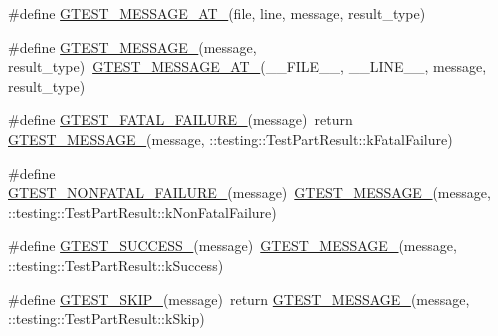 \begin{DoxyCompactItemize}
\item 
\#define \mbox{\hyperlink{googletest-master_2googletest_2include_2gtest_2internal_2gtest-internal_8h_a8d70025c45a47a493780746dfd66d565}{G\+T\+E\+S\+T\+\_\+\+M\+E\+S\+S\+A\+G\+E\+\_\+\+A\+T\+\_\+}}(file,  line,  message,  result\+\_\+type)
\item 
\#define \mbox{\hyperlink{googletest-master_2googletest_2include_2gtest_2internal_2gtest-internal_8h_a94c73d5368ec946bc354d0992ad00810}{G\+T\+E\+S\+T\+\_\+\+M\+E\+S\+S\+A\+G\+E\+\_\+}}(message,  result\+\_\+type)~\mbox{\hyperlink{_obj__test_2lib_2googletest-release-1_88_81_2googletest_2include_2gtest_2internal_2gtest-internal_8h_a8d70025c45a47a493780746dfd66d565}{G\+T\+E\+S\+T\+\_\+\+M\+E\+S\+S\+A\+G\+E\+\_\+\+A\+T\+\_\+}}(\+\_\+\+\_\+\+F\+I\+L\+E\+\_\+\+\_\+, \+\_\+\+\_\+\+L\+I\+N\+E\+\_\+\+\_\+, message, result\+\_\+type)
\item 
\#define \mbox{\hyperlink{googletest-master_2googletest_2include_2gtest_2internal_2gtest-internal_8h_a0f9a4c3ea82cc7bf4478eaffdc168358}{G\+T\+E\+S\+T\+\_\+\+F\+A\+T\+A\+L\+\_\+\+F\+A\+I\+L\+U\+R\+E\+\_\+}}(message)~return \mbox{\hyperlink{_obj__test_2lib_2googletest-release-1_88_81_2googletest_2include_2gtest_2internal_2gtest-internal_8h_a94c73d5368ec946bc354d0992ad00810}{G\+T\+E\+S\+T\+\_\+\+M\+E\+S\+S\+A\+G\+E\+\_\+}}(message, \+::testing\+::\+Test\+Part\+Result\+::k\+Fatal\+Failure)
\item 
\#define \mbox{\hyperlink{googletest-master_2googletest_2include_2gtest_2internal_2gtest-internal_8h_a6cb7482cfa03661a91c698eb5895f642}{G\+T\+E\+S\+T\+\_\+\+N\+O\+N\+F\+A\+T\+A\+L\+\_\+\+F\+A\+I\+L\+U\+R\+E\+\_\+}}(message)~\mbox{\hyperlink{_obj__test_2lib_2googletest-release-1_88_81_2googletest_2include_2gtest_2internal_2gtest-internal_8h_a94c73d5368ec946bc354d0992ad00810}{G\+T\+E\+S\+T\+\_\+\+M\+E\+S\+S\+A\+G\+E\+\_\+}}(message, \+::testing\+::\+Test\+Part\+Result\+::k\+Non\+Fatal\+Failure)
\item 
\#define \mbox{\hyperlink{googletest-master_2googletest_2include_2gtest_2internal_2gtest-internal_8h_abe012b550eb3807e8c49f7e161bd1567}{G\+T\+E\+S\+T\+\_\+\+S\+U\+C\+C\+E\+S\+S\+\_\+}}(message)~\mbox{\hyperlink{_obj__test_2lib_2googletest-release-1_88_81_2googletest_2include_2gtest_2internal_2gtest-internal_8h_a94c73d5368ec946bc354d0992ad00810}{G\+T\+E\+S\+T\+\_\+\+M\+E\+S\+S\+A\+G\+E\+\_\+}}(message, \+::testing\+::\+Test\+Part\+Result\+::k\+Success)
\item 
\#define \mbox{\hyperlink{googletest-master_2googletest_2include_2gtest_2internal_2gtest-internal_8h_ab75ed7a6cd9e466944ce680c1c07ab47}{G\+T\+E\+S\+T\+\_\+\+S\+K\+I\+P\+\_\+}}(message)~return \mbox{\hyperlink{_obj__test_2lib_2googletest-release-1_88_81_2googletest_2include_2gtest_2internal_2gtest-internal_8h_a94c73d5368ec946bc354d0992ad00810}{G\+T\+E\+S\+T\+\_\+\+M\+E\+S\+S\+A\+G\+E\+\_\+}}(message, \+::testing\+::\+Test\+Part\+Result\+::k\+Skip)

\end{DoxyCompactItemize}

